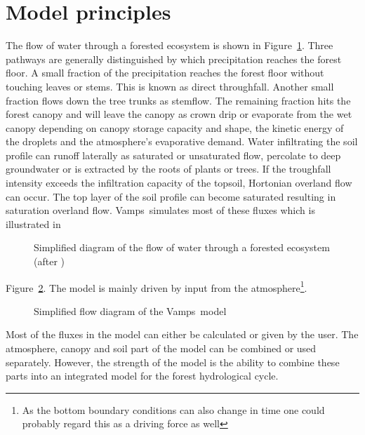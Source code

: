 \documentclass[twocolumn]{article}
\newcommand{\vamps}{{\sf Vamps}}
\begin{document}
\section*{Model principles}
The flow of water through a forested ecosystem is shown in
Figure~\ref{fig:fcycle}. Three pathways are generally 
distinguished by which precipitation reaches the forest floor. A small
fraction of the precipitation reaches the forest floor without touching leaves
or stems. This is known as direct throughfall. Another small 
fraction flows down the tree trunks as stemflow. The remaining fraction
hits the forest canopy and will leave the canopy as
crown drip or evaporate from the wet canopy depending on canopy
storage capacity and shape, the kinetic energy of the droplets and the
atmosphere's evaporative demand.  Water infiltrating the soil
profile can runoff laterally as saturated or unsaturated flow,
percolate to deep groundwater or is extracted by the roots of
plants or trees. If the troughfall intensity exceeds the infiltration
capacity of the topsoil, Hortonian overland flow can occur. The top
layer of the soil profile can become saturated resulting in saturation
overland flow. \vamps\ simulates most of these fluxes which is
illustrated in
\begin{figure}
\centerline{}
\caption{Simplified diagram of the flow of water through a forested
ecosystem (after \protect{})}
\label{fig:fcycle}
\end{figure}
Figure~\ref{fig:vflow}.
The model is mainly driven by input from
the atmosphere\footnote{As the bottom boundary conditions can also
change in time one could probably regard this as a driving force as
well}.
\begin{figure}
\centerline{}
\caption{Simplified flow diagram of the \vamps\ model}
\label{fig:vflow}
\end{figure}

Most of the fluxes in the model can either be
calculated or given by the user. The atmosphere, canopy and soil part
of the model can be combined or used separately. However, the strength
of the model is the ability to combine  these parts into an
integrated model for the forest hydrological cycle. 
\end{document}
